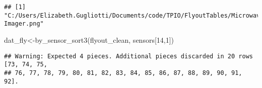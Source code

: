 \documentclass[
]{article}
\newenvironment{Shaded}{\begin{snugshade}}{\end{snugshade}}
\newcommand{\DecValTok}[1]{\textcolor[rgb]{0.00,0.00,0.81}{#1}}
\newcommand{\FunctionTok}[1]{\textcolor[rgb]{0.00,0.00,0.00}{#1}}
\newcommand{\NormalTok}[1]{#1}
\newcommand{\OtherTok}[1]{\textcolor[rgb]{0.56,0.35,0.01}{#1}}
\begin{document}
\begin{verbatim}
## [1] "C:/Users/Elizabeth.Gugliotti/Documents/code/TPIO/FlyoutTables/Microwave Imager.png"
\end{verbatim}

\begin{Shaded}
\begin{Highlighting}[]
\NormalTok{dat\_fly}\OtherTok{\textless{}{-}}\FunctionTok{by\_sensor\_sort3}\NormalTok{(flyout\_clean, sensors[}\DecValTok{14}\NormalTok{,}\DecValTok{1}\NormalTok{])}
\end{Highlighting}
\end{Shaded}

\begin{verbatim}
## Warning: Expected 4 pieces. Additional pieces discarded in 20 rows [73, 74, 75,
## 76, 77, 78, 79, 80, 81, 82, 83, 84, 85, 86, 87, 88, 89, 90, 91, 92].
\end{verbatim}
\end{document}
